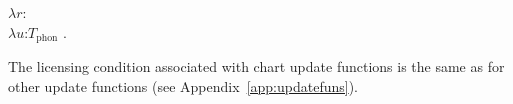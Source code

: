 \begin{ex}
\begin{subex}
  $\lambda
r$:
\\
\hspace*{1em} $\lambda u$:$T_{\mathrm{phon}}$ . \\
\hspace*{2em}
 
\end{subex} 
   
\end{ex} 
The licensing condition associated with chart update functions is the
same as for other update functions (see Appendix~\ref{app:updatefuns}).

